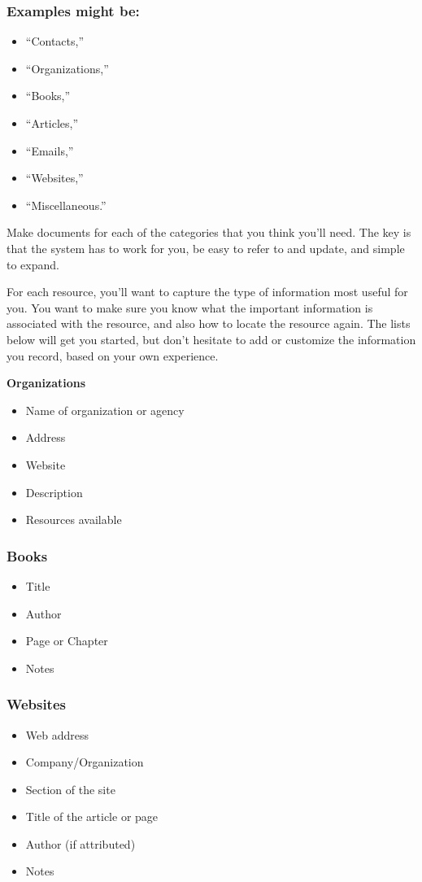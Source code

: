 \subsubsection*{Examples might be: }
\begin{itemize}[leftmargin=1.0cm]
	\item ``Contacts,''
	\item ``Organizations,''
	\item ``Books,''
	\item ``Articles,''
	\item ``Emails,''
	\item ``Websites,''
	\item ``Miscellaneous.''
\end{itemize}
Make documents for each of the categories that you think you'll need. The key is that the system has to work for you, be easy to refer to and update, and simple to expand.

For each resource, you'll want to capture the type of information most useful for you. You want to make sure you know what the important information is associated with the resource, and also how to locate the resource again. The lists below will get you started, but don't hesitate to add or customize the information you record, based on your own experience.

\pagebreak \textbf{Organizations}
\begin{itemize}[leftmargin=1.0cm]
	\item Name of organization or agency
	\item Address
	\item Website
	\item Description
	\item Resources available
\end{itemize}
\subsubsection*{Books}
\begin{itemize}[leftmargin=1.0cm]
	\item Title
	\item Author
	\item Page or Chapter
	\item Notes
\end{itemize}
\subsubsection*{Websites}
\begin{itemize}[leftmargin=1.0cm]
	\item Web address
	\item Company/Organization
	\item Section of the site
	\item Title of the article or page
	\item Author (if attributed)
	\item Notes
\end{itemize}

